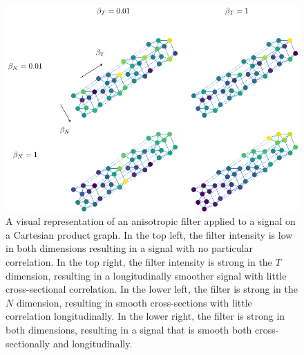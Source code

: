 \clearpage

\vspace*{\fill}

\begin{figure}[h]
    \includegraphics[width=0.95\linewidth]{Figures/2dFilters.pdf}
    \vspace*{1cm}
    \caption[A visual representation of applying an isotropic and anisotropic graph filter]{A visual representation of an anisotropic filter applied to a signal on a Cartesian product graph. In the top left, the filter intensity is low in both dimensions resulting in a signal with no particular correlation. In the top right, the filter intensity is strong in the $T$ dimension, resulting in a longitudinally smoother signal with little cross-sectional correlation. In the lower left, the filter is strong in the $N$ dimension, resulting in smooth cross-sections with little correlation longitudinally. In the lower right, the filter is strong in both dimensions, resulting in a signal that is smooth both cross-sectionally and longitudinally. }
    \label{fig:filters}
\end{figure}

\vspace*{\fill}


\clearpage

